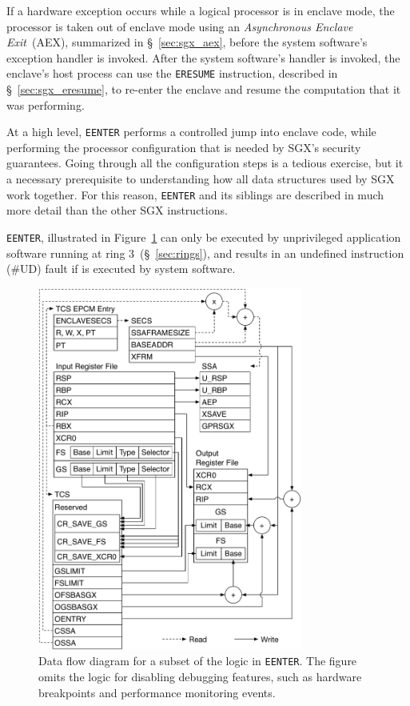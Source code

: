 If a hardware exception occurs while a logical processor is in enclave mode,
the processor is taken out of enclave mode using an
\textit{Asynchronous Enclave Exit}~(AEX), summarized in \S~\ref{sec:sgx_aex},
before the system software's exception handler is invoked. After the system
software's handler is invoked, the enclave's host process can use the
\texttt{ERESUME} instruction, described in \S~\ref{sec:sgx_eresume}, to
re-enter the enclave and resume the computation that it was performing.


\label{sec:sgx_enclave_mode}
\label{sec:sgx_eenter}

At a high level, \texttt{EENTER} performs a controlled jump into enclave code,
while performing the processor configuration that is needed by SGX's security
guarantees. Going through all the configuration steps is a tedious exercise,
but it a necessary prerequisite to understanding how all data structures used
by SGX work together. For this reason, \texttt{EENTER} and its siblings are
described in much more detail than the other SGX instructions.


\texttt{EENTER}, illustrated in Figure~\ref{fig:sgx_eenter} can only be
executed by unprivileged application software running at ring
3~(\S~\ref{sec:rings}), and results in an undefined instruction (\#UD) fault if
is executed by system software.

\begin{figure}[hbt]
  \centering
  \includegraphics[width=87mm]{figures/sgx_eenter.pdf}
  \caption{
    Data flow diagram for a subset of the logic in \texttt{EENTER}. The figure
    omits the logic for disabling debugging features, such as hardware
    breakpoints and performance monitoring events.
  }
  \label{fig:sgx_eenter}
\end{figure}

